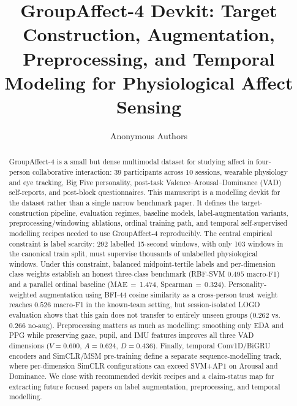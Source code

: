 \documentclass[sigconf,review,anonymous]{acmart}
\title{GroupAffect-4 Devkit: Target Construction, Augmentation, Preprocessing,
       and Temporal Modeling for Physiological Affect Sensing}
\author{Anonymous Authors}
\affiliation{\institution{Anonymous Institution}}
\begin{document}
\begin{abstract}
GroupAffect-4 is a small but dense multimodal dataset for studying affect in
four-person collaborative interaction: 39 participants across 10 sessions,
wearable physiology and eye tracking, Big Five personality, post-task
Valence--Arousal--Dominance (VAD) self-reports, and post-block questionnaires.
This manuscript is a modelling devkit for the dataset rather than a single
narrow benchmark paper.
It defines the target-construction pipeline, evaluation regimes, baseline
models, label-augmentation variants, preprocessing/windowing ablations, ordinal
training path, and temporal self-supervised modelling recipes needed to use
GroupAffect-4 reproducibly.
The central empirical constraint is label scarcity: 292 labelled 15-second
windows, with only 103 windows in the canonical train split, must supervise
thousands of unlabelled physiological windows.
Under this constraint, balanced midpoint-tertile labels and per-dimension class
weights establish an honest three-class benchmark (RBF-SVM $0.495$ macro-F1)
and a parallel ordinal baseline (MAE\,$=$\,1.474, Spearman\,$=$\,0.324).
Personality-weighted augmentation using BFI-44 cosine similarity as a
cross-person trust weight reaches $0.526$ macro-F1 in the known-team setting,
but session-isolated LOGO evaluation shows that this gain does not transfer to
entirely unseen groups ($0.262$ vs.\ $0.266$ no-aug).
Preprocessing matters as much as modelling: smoothing only EDA and PPG while
preserving gaze, pupil, and IMU features improves all three VAD dimensions
($V{=}0.600$, $A{=}0.624$, $D{=}0.436$).
Finally, temporal Conv1D/BiGRU encoders and SimCLR/MSM pre-training define a
separate sequence-modelling track, where per-dimension SimCLR configurations
can exceed SVM+AP1 on Arousal and Dominance.
We close with recommended devkit recipes and a claim-status map for extracting
future focused papers on label augmentation, preprocessing, and temporal
modelling.
\end{abstract}


\maketitle
\end{document}
